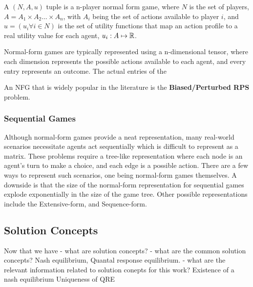 \begin{definition}

	A $(N, A, u)$ tuple
	is a n-player normal form game, where $N$ is the set of players, $A = A_1 \times A_2 \ldots \times
		A_n$, with $A_i$ being the set of actions available to player $i$, and $u = (u_i \forall i \in N)$
	is the set of utility functions that map an action profile to a real utility value for each agent,
	$u_i: A \mapsto \mathbb{R}$.

\end{definition}

Normal-form games are typically represented using a n-dimensional tensor, where each dimension
represents the possible actions available to each agent, and every entry represents an outcome.
The actual entries of the

An NFG that is widely popular in the literature is the \textbf{Biased/Perturbed RPS} problem. 

\subsubsection*{Sequential Games}

Although normal-form games provide a neat representation, many real-world scenarios necessitate
agents act sequentially which is difficult to represent as a matrix.
These problems require a tree-like representation where each node is an agent's turn to make a
choice, and each edge is a possible action.
There are a few ways to represent such scenarios, one being normal-form games themselves.
A downside is that the size of the normal-form representation for sequential games explode
exponentially in the size of the game tree.
Other possible representations include the Extensive-form, and Sequence-form.

\begin{definition}
\end{definition}

\begin{definition}
\end{definition}

\subsection{Solution Concepts}

Now that we have - what are solution concepts?
- what are the common solution concepts?
Nash equilibrium, Quantal response equilibrium.
- what are the relevant information related to solution conepts for this work?
Existence of a nash equilibrium Uniqueness of QRE

